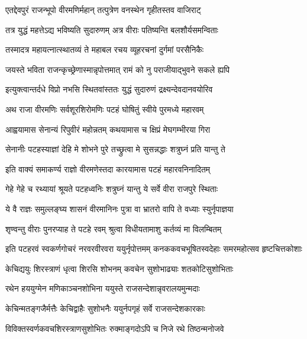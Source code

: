 
\twolineshloka
{एतद्देवपुरं राजन्भूपो वीरमणिर्महान्}
{तत्पुत्रेण वनस्थेन गृहीतस्तव वाजिराट्}%

\twolineshloka
{तत्र युद्धं महत्तेऽद्य भविष्यति सुदारुणम्}
{अत्र वीराः पतिष्यन्ति बलशौर्यसमन्विताः}%

\twolineshloka
{तस्मादत्र महायत्नात्स्थातव्यं ते महाबल}
{रचय व्यूहरचनां दुर्गमां परसैनिकैः}%

\twolineshloka
{जयस्ते भविता राजन्कृच्छ्रेणास्मान्नृपोत्तमात्}
{रामं को नु पराजीयाद्भुवने सकले ह्यपि}%

\twolineshloka
{इत्युक्त्वान्तर्दधे विप्रो नभसि स्थितवांस्ततः}
{युद्धं सुदारुणं द्रक्ष्यन्देवदानवयोरिव}%


\twolineshloka
{अथ राजा वीरमणिः सर्वशूरशिरोमणिः}
{पटहं घोषितुं स्वीये पुरमध्ये महारवम्}%

\twolineshloka
{आह्वयामास सेनान्यं रिपुवीरं महोन्नतम्}
{कथयामास च क्षिप्रं मेघगम्भीरया गिरा}%


\twolineshloka
{सेनानीः पटहस्याज्ञां देहि मे शोभने पुरे}
{तच्छ्रुत्वा मे सुसन्नद्धाः शत्रुघ्नं प्रति यान्तु ते}%

\twolineshloka
{इति वाक्यं समाकर्ण्य राज्ञो वीरमणेस्तदा}
{कारयामास पटहं महारवनिनादितम्}%

\twolineshloka
{गेहे गेहे च रथ्यायां श्रूयते पटहध्वनिः}
{शत्रुघ्नं यान्तु ये सर्वे वीरा राजपुरे स्थिताः}%

\twolineshloka
{ये वै राज्ञः समुल्लङ्घ्य शासनं वीरमानिनः}
{पुत्रा वा भ्रातरो वापि ते वध्याः स्युर्नृपाज्ञया}%

\twolineshloka
{शृण्वन्तु वीराः पुनरप्याह ते पटहे रवम्}
{श्रुत्वा विधीयतामाशु कर्तव्यं मा विलम्बितम्}%


\fourlineindentedshloka
{इति पटहरवं स्वकर्णगोचरं}
{नरवरवीरवरा ययुर्नृपोत्तमम्}
{कनककवचभूषितस्वदेहाः}
{समरमहोत्सव हृष्टचित्तकोशाः}%

\twolineshloka
{केचिद्ययुः शिरस्त्राणं धृत्वा शिरसि शोभनम्}
{कवचेन सुशोभाढ्याः शतकोटिसुशोभिताः}%

\twolineshloka
{रथेन हययुग्मेन मणिकाञ्चनशोभिना}
{ययुस्ते राजसन्देशान्नृवरालयमुन्मदाः}%

\twolineshloka
{केचिन्मतङ्गजैर्मत्तैः केचिद्वाहैः सुशोभनैः}
{ययुर्नपगृहं सर्वे राजसन्देशकारकाः}%

\twolineshloka
{विविक्तस्वर्णकवचशिरस्त्राणसुशोभितः}
{रुक्माङ्गदोऽपि च निजे रथे तिष्ठन्मनोजवे}%

